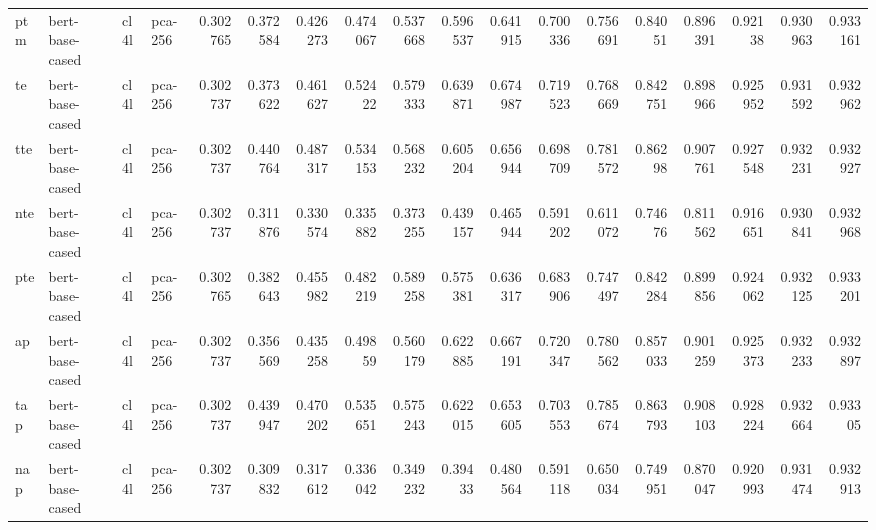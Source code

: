 \begin{tabular}{llllrrrrrrrrrrrrrr}
 ptm         & bert-base-cased     & cl4l             & pca-256               &     0.302765 &     0.372584 &     0.426273 &     0.474067 &     0.537668 &     0.596537 &     0.641915 &     0.700336 &     0.756691 &     0.84051  &      0.896391 &      0.92138  &      0.930963 &      0.933161 \\
 te          & bert-base-cased     & cl4l             & pca-256               &     0.302737 &     0.373622 &     0.461627 &     0.52422  &     0.579333 &     0.639871 &     0.674987 &     0.719523 &     0.768669 &     0.842751 &      0.898966 &      0.925952 &      0.931592 &      0.932962 \\
 tte         & bert-base-cased     & cl4l             & pca-256               &     0.302737 &     0.440764 &     0.487317 &     0.534153 &     0.568232 &     0.605204 &     0.656944 &     0.698709 &     0.781572 &     0.86298  &      0.907761 &      0.927548 &      0.932231 &      0.932927 \\
 nte         & bert-base-cased     & cl4l             & pca-256               &     0.302737 &     0.311876 &     0.330574 &     0.335882 &     0.373255 &     0.439157 &     0.465944 &     0.591202 &     0.611072 &     0.74676  &      0.811562 &      0.916651 &      0.930841 &      0.932968 \\
 pte         & bert-base-cased     & cl4l             & pca-256               &     0.302765 &     0.382643 &     0.455982 &     0.482219 &     0.589258 &     0.575381 &     0.636317 &     0.683906 &     0.747497 &     0.842284 &      0.899856 &      0.924062 &      0.932125 &      0.933201 \\
 ap          & bert-base-cased     & cl4l             & pca-256               &     0.302737 &     0.356569 &     0.435258 &     0.49859  &     0.560179 &     0.622885 &     0.667191 &     0.720347 &     0.780562 &     0.857033 &      0.901259 &      0.925373 &      0.932233 &      0.932897 \\
 tap         & bert-base-cased     & cl4l             & pca-256               &     0.302737 &     0.439947 &     0.470202 &     0.535651 &     0.575243 &     0.622015 &     0.653605 &     0.703553 &     0.785674 &     0.863793 &      0.908103 &      0.928224 &      0.932664 &      0.93305  \\
 nap         & bert-base-cased     & cl4l             & pca-256               &     0.302737 &     0.309832 &     0.317612 &     0.336042 &     0.349232 &     0.39433  &     0.480564 &     0.591118 &     0.650034 &     0.749951 &      0.870047 &      0.920993 &      0.931474 &      0.932913 \\

\end{tabular}
